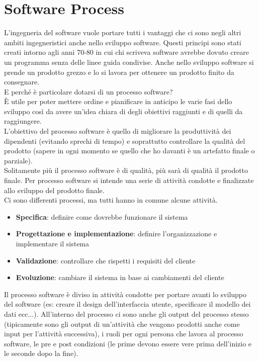 \section{Software Process}
\label{sec:02_software_process}
L'ingegneria del software vuole portare tutti i vantaggi che ci sono negli altri ambiti ingegneristici anche nello sviluppo software.
Questi principi sono stati creati intorno agli anni 70-80 in cui chi scriveva software avrebbe dovuto creare un programma senza delle linee guida condivise.
Anche nello sviluppo software si prende un prodotto grezzo e lo si lavora per ottenere un prodotto finito da consegnare.\\
E perché è particolare dotarsi di un processo software?\\
È utile per poter mettere ordine e pianificare in anticipo le varie fasi dello sviluppo così da avere un'idea chiara di degli obiettivi raggiunti e di quelli da raggiungere.\\
L'obiettivo del processo software è quello di migliorare la produttività dei dipendenti (evitando sprechi di tempo) e soprattutto controllare la qualità del prodotto (sapere in ogni momento se quello che ho davanti è un artefatto finale o parziale).\\
Solitamente più il processo software è di qualità, più sarà di qualità il prodotto finale.
Per processo software si intende una serie di attività condotte e finalizzate allo sviluppo del prodotto finale.\\
Ci sono differenti processi, ma tutti hanno in comune alcune attività.
\begin{itemize}[noitemsep]
    \item \textbf{Specifica}: definire come dovrebbe funzionare il sistema
    \item \textbf{Progettazione e implementazione}: definire l'organizzazione e implementare il sistema
    \item \textbf{Validazione}: controllare che rispetti i requisiti del cliente
    \item \textbf{Evoluzione}: cambiare il sistema in base ai cambiamenti del cliente
\end{itemize}
Il processo software è diviso in attività condotte per portare avanti lo sviluppo del software (es: creare il design dell'interfaccia utente, specificare il modello dei dati ecc...).
All'interno del processo ci sono anche gli output del processo stesso (tipicamente sono gli output di un'attività che vengono prodotti anche come input per l'attività successiva), i ruoli per ogni persona che lavora al processo software, le pre e post condizioni (le prime devono essere vere prima dell'inizio e le seconde dopo la fine).\\
